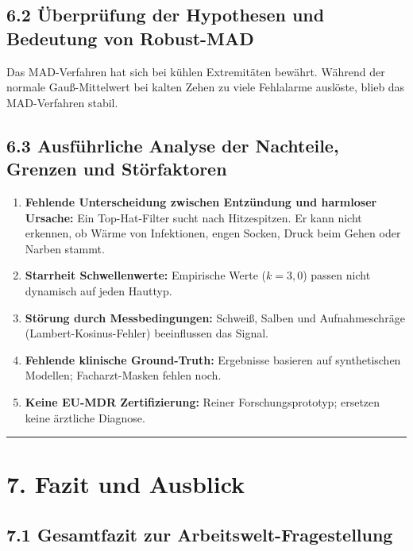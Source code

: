 \documentclass[
  11pt,
]{article}
\providecommand{\tightlist}{%
  \setlength{\itemsep}{0pt}\setlength{\parskip}{0pt}}
\begin{document}
\subsection{6.2 Überprüfung der Hypothesen und Bedeutung von
Robust-MAD}\label{uxfcberpruxfcfung-der-hypothesen-und-bedeutung-von-robust-mad}

Das MAD-Verfahren hat sich bei kühlen Extremitäten bewährt. Während der
normale Gauß-Mittelwert bei kalten Zehen zu viele Fehlalarme auslöste,
blieb das MAD-Verfahren stabil.

\subsection{6.3 Ausführliche Analyse der Nachteile, Grenzen und
Störfaktoren}\label{ausfuxfchrliche-analyse-der-nachteile-grenzen-und-stuxf6rfaktoren}

\begin{enumerate}
\def\labelenumi{\arabic{enumi}.}
\tightlist
\item
  \textbf{Fehlende Unterscheidung zwischen Entzündung und harmloser
  Ursache:} Ein Top-Hat-Filter sucht nach Hitzespitzen. Er kann nicht
  erkennen, ob Wärme von Infektionen, engen Socken, Druck beim Gehen
  oder Narben stammt.
\item
  \textbf{Starrheit Schwellenwerte:} Empirische Werte (\(k=3{,}0\))
  passen nicht dynamisch auf jeden Hauttyp.
\item
  \textbf{Störung durch Messbedingungen:} Schweiß, Salben und
  Aufnahmeschräge (Lambert-Kosinus-Fehler) beeinflussen das Signal.
\item
  \textbf{Fehlende klinische Ground-Truth:} Ergebnisse basieren auf
  synthetischen Modellen; Facharzt-Masken fehlen noch.
\item
  \textbf{Keine EU-MDR Zertifizierung:} Reiner Forschungsprototyp;
  ersetzen keine ärztliche Diagnose.
\end{enumerate}

\begin{center}\rule{0.5\linewidth}{0.5pt}\end{center}

\section{7. Fazit und Ausblick}\label{fazit-und-ausblick}

\subsection{7.1 Gesamtfazit zur
Arbeitswelt-Fragestellung}\label{gesamtfazit-zur-arbeitswelt-fragestellung}
\end{document}
